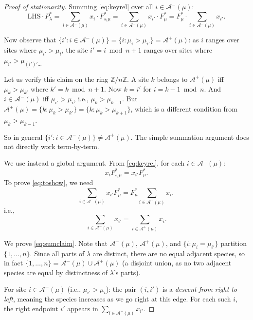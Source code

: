\documentclass[12pt]{article}
\theoremstyle{definition}
\begin{document}
\begin{proof}[Proof of stationarity]
Summing \eqref{eq:keyrel} over all $i \in \mathcal{A}^-(\mu)$:
\begin{equation}\label{eq:LHS_sum}
  \mathrm{LHS} \cdot P^*_\lambda
  = \sum_{i \in \mathcal{A}^-(\mu)} x_i \cdot F^*_{s_i\mu}
  = \sum_{i \in \mathcal{A}^-(\mu)} x_{i'} \cdot F^*_\mu
  = F^*_\mu \cdot \sum_{i \in \mathcal{A}^-(\mu)} x_{i'}.
\end{equation}

Now observe that $\{i' : i \in \mathcal{A}^-(\mu)\} = \{i : \mu_i > \mu_{i'}\}
= \mathcal{A}^+(\mu)$: as $i$ ranges over sites where $\mu_{i'} > \mu_i$, the
site $i' = i \bmod n + 1$ ranges over sites where $\mu_{i'} > \mu_{(i')'... }$

Let us verify this claim on the ring $\mathbb{Z}/n\mathbb{Z}$.  A site $k$
belongs to $\mathcal{A}^+(\mu)$ iff $\mu_k > \mu_{k'}$ where $k' = k \bmod n
+1$.  Now $k = i'$ for $i = k - 1 \bmod n$.  And $i \in \mathcal{A}^-(\mu)$
iff $\mu_{i'} > \mu_i$, i.e., $\mu_k > \mu_{k-1}$.  But $\mathcal{A}^+(\mu) =
\{k : \mu_k > \mu_{k'}\} = \{k : \mu_k > \mu_{k+1}\}$, which is a different
condition from $\mu_k > \mu_{k-1}$.

So in general $\{i' : i \in \mathcal{A}^-(\mu)\} \neq \mathcal{A}^+(\mu)$.
The simple summation argument does not directly work term-by-term.

\medskip

We use instead a global argument.  From \eqref{eq:keyrel}, for each
$i \in \mathcal{A}^-(\mu)$:
\[
  x_i F^*_{s_i\mu} = x_{i'} F^*_\mu.
\]
To prove \eqref{eq:toshow}, we need
\[
  \sum_{i \in \mathcal{A}^-(\mu)} x_{i'} F^*_\mu
  = F^*_\mu \sum_{i \in \mathcal{A}^+(\mu)} x_i,
\]
i.e.,
\begin{equation}\label{eq:sumclaim}
  \sum_{i \in \mathcal{A}^-(\mu)} x_{i'} = \sum_{i \in \mathcal{A}^+(\mu)} x_i.
\end{equation}

We prove \eqref{eq:sumclaim}.  Note that $\mathcal{A}^-(\mu)$, $\mathcal{A}^+(\mu)$, and $\{i : \mu_i = \mu_{i'}\}$ partition $\{1,\dots,n\}$.  Since all parts of $\lambda$ are distinct, there are no equal adjacent species, so in fact $\{1,\dots,n\} = \mathcal{A}^-(\mu) \cup \mathcal{A}^+(\mu)$ (a disjoint union, as no two adjacent species are equal by distinctness of $\lambda$'s parts).

For site $i \in \mathcal{A}^-(\mu)$ (i.e., $\mu_{i'} > \mu_i$): the pair
$(i, i')$ is a \emph{descent from right to left}, meaning the species increases
as we go right at this edge.  For each such $i$, the right endpoint $i'$ appears
in $\sum_{i \in \mathcal{A}^-(\mu)} x_{i'}$.


\end{proof}
\end{document}

